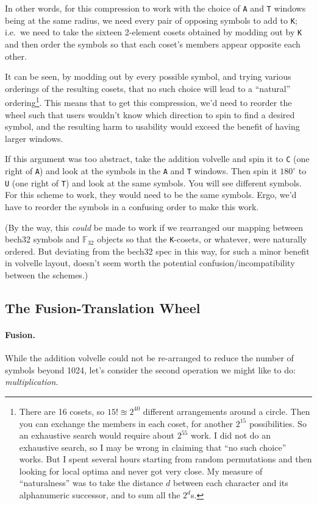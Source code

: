 \documentclass[letterpaper]{article}
\newcommand{\fttwo}{\mathbb{F}_{32}}
\newcommand{\vc}[1]{\texttt{#1}} %
\begin{document}
In other words, for this compression to work with the choice of \vc{A} and \vc{T}
windows being at the same radius, we need every pair of opposing
symbols to add to \vc{K}; i.e.~we need to take the sixteen 2-element cosets
obtained by modding out by \vc{K} and then order the symbols so that each
coset's members appear opposite each other.

It can be seen, by modding out by every possible symbol, and trying various
orderings of the resulting cosets, that no such choice will lead to a
``natural'' ordering\footnote{There are 16 cosets, so $15!\approxeq2^{40}$
different arrangements around a circle. Then you can exchange the members
in each coset, for another $2^{15}$ possibilities. So an exhaustive search
would require about $2^{55}$ work. I did not do an exhaustive search, so I
may be wrong in claiming that ``no such choice'' works. But I spent several
hours starting from random permutations and then looking for local optima
and never got very close. My measure of ``naturalness'' was to take the
distance $d$ between each character and its alphanumeric successor, and to
sum all the $2^d$s.}. This means that to get this compression, we'd need
to reorder the wheel such that users wouldn't know which direction to spin
to find a desired symbol, and the resulting harm to usability would exceed
the benefit of having larger windows.

If this argument was too abstract, take the addition volvelle and spin it to
\vc{C} (one right of \vc{A}) and look at the symbols in the \vc{A} and \vc{T}
windows. Then spin it $180^\circ$ to \vc{U} (one right of \vc{T}) and look
at the same symbols. You will see different symbols. For this scheme to work,
they would need to be the same symbols. Ergo, we'd have to reorder the symbols
in a confusing order to make this work.

(By the way, this \emph{could} be made to work if we rearranged our mapping
between bech32 symbols and $\fttwo$ objects so that the \vc{K}-cosets, or
whatever, were naturally ordered. But deviating from the bech32 spec in this
way, for such a minor benefit in volvelle layout, doesn't seem worth the
potential confusion/incompatibility between the schemes.)

\subsection{The Fusion-Translation Wheel}

\paragraph{Fusion.}
While the addition volvelle could not be re-arranged to reduce the number of
symbols beyond 1024, let's consider the second operation we might like to do:
\emph{multiplication}.
\end{document}
